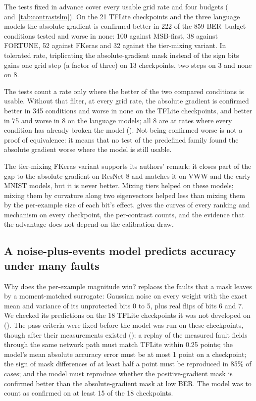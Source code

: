 The tests fixed in advance cover every usable grid rate and four budgets ( and~\ref{tab:contrastslm}). On the 21 TFLite checkpoints and the three language models the absolute gradient is confirmed better in 222 of the 859 BER--budget conditions tested and worse in none: 100 against MSB-first, 38 against FORTUNE, 52 against FKeras and 32 against the tier-mixing variant. In tolerated rate, triplicating the absolute-gradient mask instead of the sign bits gains one grid step (a factor of three) on 13 checkpoints, two steps on 3 and none on 8.

The tests count a rate only where the better of the two compared conditions is usable. Without that filter, at every grid rate, the absolute gradient is confirmed better in 345 conditions and worse in none on the TFLite checkpoints, and better in 75 and worse in 8 on the language models; all 8 are at rates where every condition has already broken the model (). Not being confirmed worse is not a proof of equivalence: it means that no test of the predefined family found the absolute gradient worse where the model is still usable.

The tier-mixing FKeras variant supports its authors' remark: it closes part of the gap to the absolute gradient on ResNet-8 and matches it on VWW and the early MNIST models, but it is never better. Mixing tiers helped on these models; mixing them by curvature along two eigenvectors helped less than mixing them by the per-example size of each bit's effect.  gives the curves of every ranking and mechanism on every checkpoint, the per-contrast counts, and the evidence that the advantage does not depend on the calibration draw.

\subsection{A noise-plus-events model predicts accuracy under many faults}\label{sec:noise}
Why does the per-example magnitude win?  replaces the faults that a mask leaves by a moment-matched surrogate: Gaussian noise on every weight with the exact mean and variance of its unprotected bits 0 to 5, plus real flips of bits 6 and 7. We checked its predictions on the 18 TFLite checkpoints it was not developed on (). The pass criteria were fixed before the model was run on these checkpoints, though after their measurements existed (): a replay of the measured fault fields through the same network path must match TFLite within 0.25 points; the model's mean absolute accuracy error must be at most 1 point on a checkpoint; the sign of mask differences of at least half a point must be reproduced in 85\% of cases; and the model must reproduce whether the positive-gradient mask is confirmed better than the absolute-gradient mask at low BER. The model was to count as confirmed on at least 15 of the 18 checkpoints.


